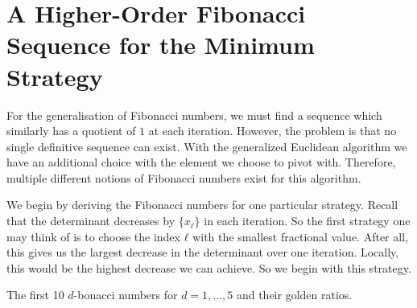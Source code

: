 \section{A Higher-Order Fibonacci Sequence for the Minimum Strategy}


For the generalisation of Fibonacci numbers,
we must find a sequence which similarly has a quotient of $1$ at each iteration.
However, the problem is that no single definitive sequence can exist.
With the generalized Euclidean algorithm we have an additional choice with the
element we choose to pivot with.
Therefore, multiple different notions of Fibonacci numbers exist for this
algorithm.

We begin by deriving the Fibonacci numbers for one particular strategy.
Recall that the determinant decreases by $\{x_ℓ\}$ in each iteration.
So the first strategy one may think of is to choose the index $ℓ$ with the
smallest fractional value.
After all, this gives us the largest decrease in the determinant over one iteration.
Locally, this would be the highest decrease we can achieve.
So we begin with this strategy.


\begin{table}[tbp]
  \caption{The first 10 $d$-bonacci numbers for $d = 1, …, 5$ and their golden ratios.}
  \label{tbl:min-fibonacci}
  \centering
  
\end{table}

